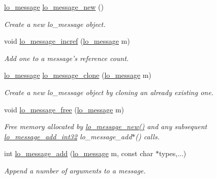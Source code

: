 \begin{DoxyCompactItemize}
\hyperlink{lo__types_8h_ad126083c98d941f00eb72d1690b38d63}{lo\+\_\+message} \hyperlink{group__liblolowlevel_ga2cce2e97452e3e9d6b5d3af33bb1d153}{lo\+\_\+message\+\_\+new} ()
\begin{DoxyCompactList}\small\item\em Create a new lo\+\_\+message object. \end{DoxyCompactList}\item 
void \hyperlink{group__liblolowlevel_gae4007dd073375b8448a0c8efcb39da52}{lo\+\_\+message\+\_\+incref} (\hyperlink{lo__types_8h_ad126083c98d941f00eb72d1690b38d63}{lo\+\_\+message} m)
\begin{DoxyCompactList}\small\item\em Add one to a message's reference count. \end{DoxyCompactList}\item 
\hyperlink{lo__types_8h_ad126083c98d941f00eb72d1690b38d63}{lo\+\_\+message} \hyperlink{group__liblolowlevel_ga8cf4889aa1b479e3b6eaf8847c3b9e4f}{lo\+\_\+message\+\_\+clone} (\hyperlink{lo__types_8h_ad126083c98d941f00eb72d1690b38d63}{lo\+\_\+message} m)
\begin{DoxyCompactList}\small\item\em Create a new lo\+\_\+message object by cloning an already existing one. \end{DoxyCompactList}\item 
void \hyperlink{group__liblolowlevel_ga93d3687e77ae20167b82830c917a3e50}{lo\+\_\+message\+\_\+free} (\hyperlink{lo__types_8h_ad126083c98d941f00eb72d1690b38d63}{lo\+\_\+message} m)
\begin{DoxyCompactList}\small\item\em Free memory allocated by \hyperlink{group__liblolowlevel_ga2cce2e97452e3e9d6b5d3af33bb1d153}{lo\+\_\+message\+\_\+new()} and any subsequent \hyperlink{group__liblolowlevel_ga7c9df1bd975a32fb6c8105e6fe327149}{lo\+\_\+message\+\_\+add\+\_\+int32} lo\+\_\+message\+\_\+add$\ast$() calls. \end{DoxyCompactList}\item 
int \hyperlink{group__liblolowlevel_ga4e7a6d91a06e795ded9676d089abea24}{lo\+\_\+message\+\_\+add} (\hyperlink{lo__types_8h_ad126083c98d941f00eb72d1690b38d63}{lo\+\_\+message} m, const char $\ast$types,...)
\begin{DoxyCompactList}\small\item\em Append a number of arguments to a message. \end{DoxyCompactList}\item 

\end{DoxyCompactItemize}
